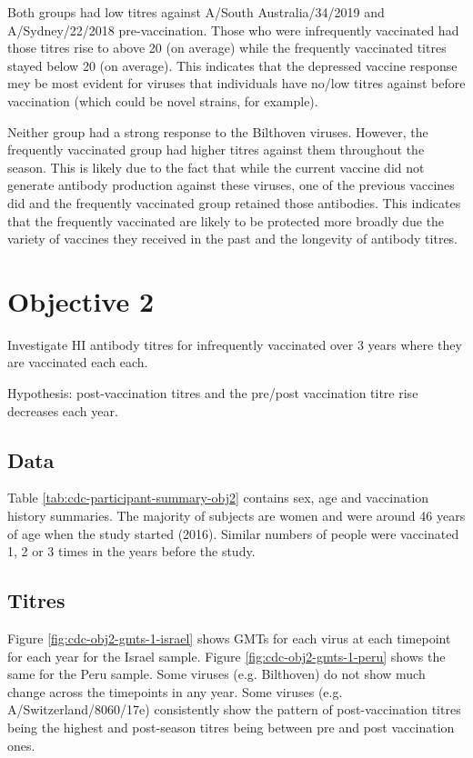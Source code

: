\documentclass[12pt]{article}
\begin{document}
Both groups had low titres against A/South Australia/34/2019 and A/Sydney/22/2018 pre-vaccination. Those who were infrequently vaccinated had those titres rise to above 20 (on average) while the frequently vaccinated titres stayed below 20 (on average). This indicates that the depressed vaccine response mey be most evident for viruses that individuals have no/low titres against before vaccination (which could be novel strains, for example).

Neither group had a strong response to the Bilthoven viruses. However, the frequently vaccinated group had higher titres against them throughout the season. This is likely due to the fact that while the current vaccine did not generate antibody production against these viruses, one of the previous vaccines did and the frequently vaccinated group retained those antibodies. This indicates that the frequently vaccinated are likely to be protected more broadly due the variety of vaccines they received in the past and the longevity of antibody titres.

\section{Objective 2}

Investigate HI antibody titres for infrequently vaccinated over 3 years where
they are vaccinated each each.

Hypothesis: post-vaccination titres and the pre/post vaccination titre rise
decreases each year.

\subsection{Data}

Table \ref{tab:cdc-participant-summary-obj2} contains sex, age and
vaccination history summaries.
The majority of subjects are
women and were around 46 years of age when the study started (2016).
Similar numbers of people were vaccinated 1, 2 or 3 times in the years before
the study.



\subsection{Titres}

Figure \ref{fig:cdc-obj2-gmts-1-israel} shows GMTs for each virus at each timepoint for each year for the Israel sample. Figure \ref{fig:cdc-obj2-gmts-1-peru} shows the same for the Peru sample.
Some viruses (e.g. Bilthoven) do not show much change across the timepoints in
any year. Some viruses (e.g. A/Switzerland/8060/17e) consistently show the pattern of post-vaccination titres being the highest and post-season titres being between pre and post vaccination ones.
\end{document}
